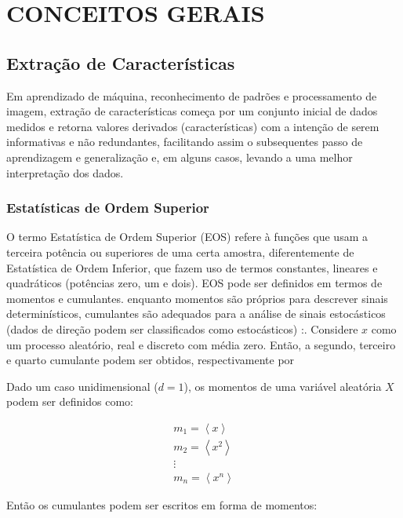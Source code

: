 \chapter{CONCEITOS GERAIS}


\section{Extração de Características}

Em aprendizado de máquina, reconhecimento de padrões e processamento de imagem, extração de características começa por um conjunto inicial de dados medidos e retorna valores derivados (características) com a intenção de serem informativas e não redundantes, facilitando assim o subsequentes passo de aprendizagem e generalização e, em alguns casos, levando a uma melhor interpretação dos dados. 

\subsection{Estatísticas de Ordem Superior}

O termo Estatística de Ordem Superior (EOS) refere à funções que usam a terceira potência ou superiores de uma certa amostra, diferentemente de Estatística de Ordem Inferior, que fazem uso de termos constantes, lineares e quadráticos (potências zero, um e dois). EOS pode ser definidos em termos de momentos e cumulantes. enquanto momentos são próprios para descrever sinais determinísticos, cumulantes são adequados para a análise de sinais estocásticos (dados de direção podem ser classificados como estocásticos) \cite{guedes2016non}:. 
Considere $x$ como um processo aleatório, real e discreto com média zero. Então, a segundo, terceiro e quarto cumulante podem ser obtidos, respectivamente por 

Dado um caso unidimensional ($d = 1$), os momentos de uma variável aleatória $X$ podem ser definidos como:

\begin{equation}
    \begin{matrix}
        m_1 = \left \langle x \right \rangle\\ 
        m_2 = \left \langle x^{2} \right \rangle\\ 
        \vdots \\ 
        m_n = \left \langle x^{n} \right \rangle
    \end{matrix}
\end{equation}

Então os cumulantes podem ser escritos em forma de momentos:

